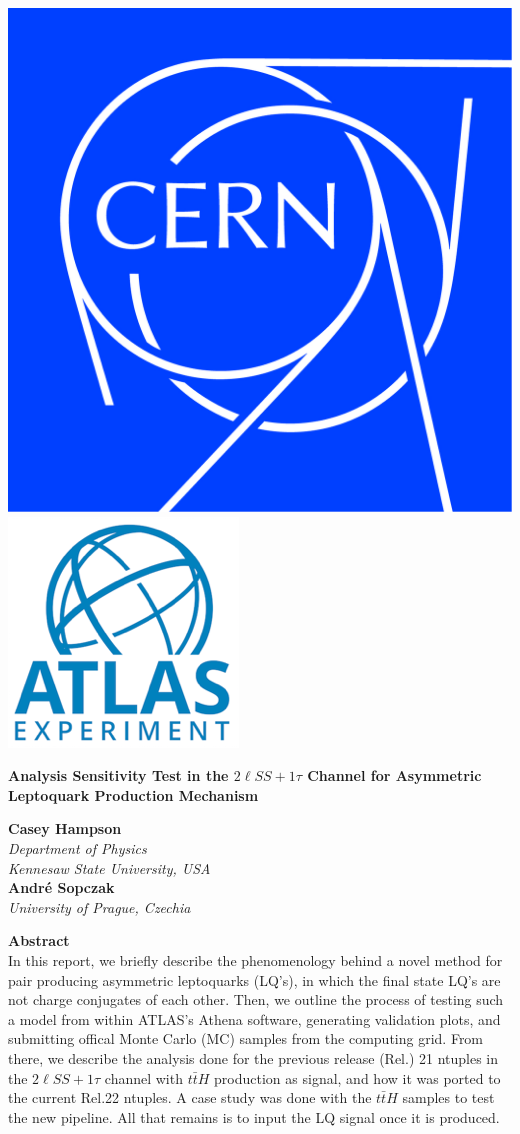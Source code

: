 \begin{titlepage}
    \begin{center}
        \vspace*{8mm}

        \includegraphics[width=0.2\linewidth]{./res/TitlePagePics/CERNLogo.jpg}
        \includegraphics[width=0.2\linewidth]{./res/TitlePagePics/ATLASLogo.png}

        \vspace*{8mm}
            
        \Huge
        \textbf{Analysis Sensitivity Test in the $2\ell SS + 1\tau$ Channel for Asymmetric Leptoquark Production Mechanism}
            
        \vspace{1.8cm}
         
        \LARGE
        \textbf{Casey Hampson} \\
        \Large
        \textit{Department of Physics}\\
        \textit{Kennesaw State University, USA}\\
        \vspace*{5mm}
        \textbf{Andr\'e Sopczak} \\
        \Large
        \textit{University of Prague, Czechia}\\
        

        \vfill

        \begin{center}
            \Large
            \textbf{Abstract} \\
            \large
            In this report, we briefly describe the phenomenology behind a novel method for pair producing asymmetric leptoquarks (LQ's), in which the final state LQ's are not charge conjugates of each other. Then, we outline the process of testing such a model from within ATLAS's Athena software, generating validation plots, and submitting offical Monte Carlo (MC) samples from the computing grid. From there, we describe the analysis done for the previous release (Rel.) 21 ntuples in the $2\ell SS + 1\tau$ channel with $t\bar{t}H$ production as signal, and how it was ported to the current Rel.22 ntuples. A case study was done with the $t\bar{t}H$ samples to test the new pipeline. All that remains is to input the LQ signal once it is produced.
        \end{center}
            

\end{center}
\end{titlepage}
